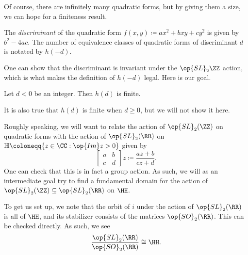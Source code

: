 \documentclass[../notes.tex]{subfiles}
\begin{document}
Of course, there are infinitely many quadratic forms, but by giving them a size, we can hope for a finiteness result.
\begin{definition}[discriminant]
	The \textit{discriminant} of the quadratic form $f(x,y)\coloneqq ax^2+bxy+cy^2$ is given by $b^2-4ac$. The number of equivalence classes of quadratic forms of discriminant $d$ is notated by $h(-d)$.
\end{definition}
One can show that the discriminant is invariant under the $\op{SL}_2\ZZ$ action, which is what makes the definition of $h(-d)$ legal. Here is our goal.
\begin{theorem}
	Let $d<0$ be an integer. Then $h(d)$ is finite.
\end{theorem}
\begin{remark}
	It is also true that $h(d)$ is finite when $d\ge0$, but we will not show it here.
\end{remark}
Roughly speaking, we will want to relate the action of $\op{SL}_2(\ZZ)$ on quadratic forms with the action of $\op{SL}_2(\RR)$ on $\mathbb H\coloneqq\{z\in\CC:\op{Im}z>0\}$ given by
\[\begin{bmatrix}
	a & b \\
	c & d
\end{bmatrix}z\coloneqq\frac{az+b}{cz+d}.\]
One can check that this is in fact a group action. As such, we will as an intermediate goal try to find a fundamental domain for the action of $\op{SL}_2(\ZZ)\subseteq\op{SL}_2(\RR)$ on $\HH$.
\begin{remark}
	To get us set up, we note that the orbit of $i$ under the action of $\op{SL}_2(\RR)$ is all of $\HH$, and its stabilizer consists of the matrices $\op{SO}_2(\RR)$. This can be checked directly. As such, we see
	\[\frac{\op{SL}_2(\RR)}{\op{SO}_2(\RR)}\cong\HH.\]
\end{remark}
\end{document}
